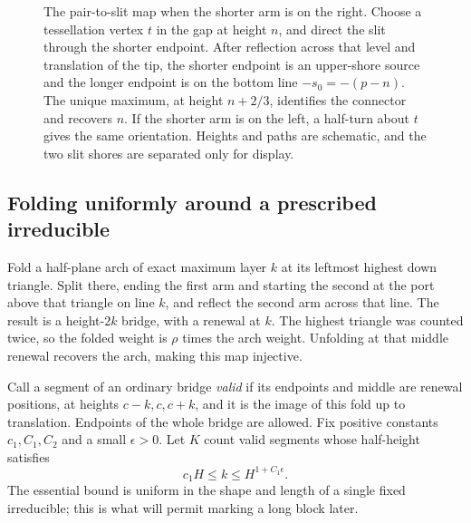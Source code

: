 \begin{figure}[ht]
\caption{The pair-to-slit map when the shorter arm is on the right.
Choose a tessellation vertex $t$ in the gap at height $n$, and direct
the slit through the shorter endpoint.  After reflection across that
level and translation of the tip, the shorter endpoint is an upper-shore
source and the longer endpoint is on the bottom line
$-s_0=-(p-n)$.  The unique maximum, at height $n+2/3$, identifies the
connector and recovers $n$.  If the shorter arm is on the left, a
half-turn about $t$ gives the same orientation.  Heights and paths are
schematic, and the two slit shores are separated only for display.}
\label{R:alt:j:pair-slit-figure}
\end{figure}

\subsection{Folding uniformly around a prescribed irreducible}

Fold a half-plane arch of exact maximum layer $k$ at its leftmost highest
down triangle. Split there, ending the first arm and starting the second
at the port above that triangle on line $k$, and reflect the second arm
across that line. The result is a height-$2k$ bridge, with a renewal at
$k$. The highest triangle was counted twice, so the folded weight is
$\rho$ times the arch weight. Unfolding at that middle renewal recovers
the arch, making this map injective.

Call a segment of an ordinary bridge \emph{valid} if its endpoints and
middle are renewal positions, at heights $c-k,c,c+k$, and it is the image
of this fold up to translation. Endpoints of the whole bridge are allowed.
Fix positive constants $c_1,C_1,C_2$ and a small $\epsilon>0$. Let $K$ count
valid segments whose half-height satisfies
\[
 c_1H\le k\le H^{1+C_1\epsilon}.
\]
The essential bound is uniform in the shape and length of a single fixed
irreducible; this is what will permit marking a long block later.

